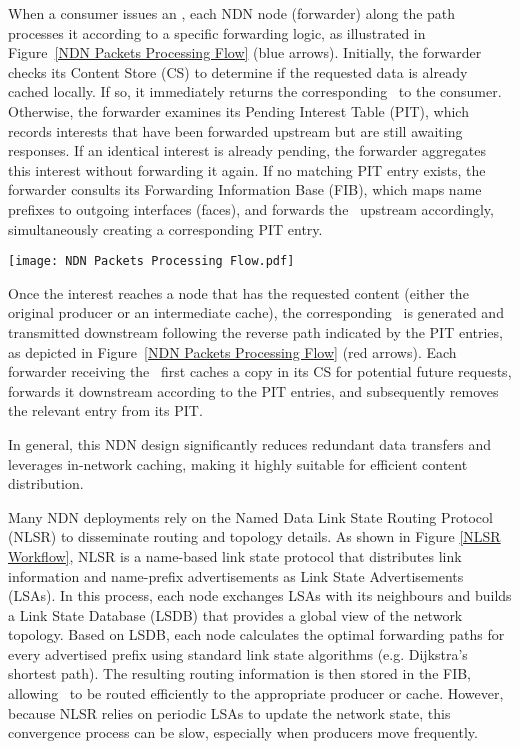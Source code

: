 When a consumer issues an \InterestPacket, each NDN node (forwarder) along the path processes it according to a specific forwarding logic, as illustrated in Figure~\ref{NDN Packets Processing Flow} (blue arrows). Initially, the forwarder checks its Content Store (CS) to determine if the requested data is already cached locally. If so, it immediately returns the corresponding \DataPacket\ to the consumer. Otherwise, the forwarder examines its Pending Interest Table (PIT), which records interests that have been forwarded upstream but are still awaiting responses. If an identical interest is already pending, the forwarder aggregates this interest without forwarding it again. If no matching PIT entry exists, the forwarder consults its Forwarding Information Base (FIB), which maps name prefixes to outgoing interfaces (faces), and forwards the \InterestPacket\ upstream accordingly, simultaneously creating a corresponding PIT entry.

\begin{figure*}[t]
    \centering
    \texttt{[image: NDN Packets Processing Flow.pdf]}
    \caption{NDN Packets Processing Flow}
    \label{NDN Packets Processing Flow}
\end{figure*}

Once the interest reaches a node that has the requested content (either the original producer or an intermediate cache), the corresponding \DataPacket\ is generated and transmitted downstream following the reverse path indicated by the PIT entries, as depicted in Figure~\ref{NDN Packets Processing Flow} (red arrows). Each forwarder receiving the \DataPacket\ first caches a copy in its CS for potential future requests, forwards it downstream according to the PIT entries, and subsequently removes the relevant entry from its PIT.

In general, this NDN design significantly reduces redundant data transfers and leverages in-network caching, making it highly suitable for efficient content distribution.

Many NDN deployments rely on the Named Data Link State Routing Protocol (NLSR) to disseminate routing and topology details. As shown in Figure \ref{NLSR Workflow}, NLSR is a name-based link state protocol that distributes link information and name-prefix advertisements as Link State Advertisements (LSAs). In this process, each node exchanges LSAs with its neighbours and builds a Link State Database (LSDB) that provides a global view of the network topology. Based on LSDB, each node calculates the optimal forwarding paths for every advertised prefix using standard link state algorithms (e.g. Dijkstra's shortest path). The resulting routing information is then stored in the FIB, allowing \InterestPackets\ to be routed efficiently to the appropriate producer or cache. However, because NLSR relies on periodic LSAs to update the network state, this convergence process can be slow, especially when producers move frequently.

